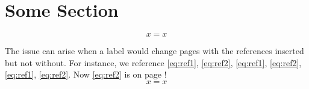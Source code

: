 \documentclass[12pt]{article}
\begin{document}
\section{Some Section}
\begin{equation}
  x = x
  \tag{MyAmazingEquation}\label{eq:ref1}
\end{equation}

\begin{spacing}{1.7}
\lipsum[1-2]

The issue can arise when a label would change pages with the references inserted but not without. For instance, we reference \eqref{eq:ref1}, \eqref{eq:ref2}, \eqref{eq:ref1}, \eqref{eq:ref2}, \eqref{eq:ref1}, \eqref{eq:ref2}. Now \eqref{eq:ref2} is on page \pageref{eq:ref2}!
\begin{equation}
  x = x
  \tag{MyOtherEquation}\label{eq:ref2}
\end{equation}
\end{spacing}
\end{document}
